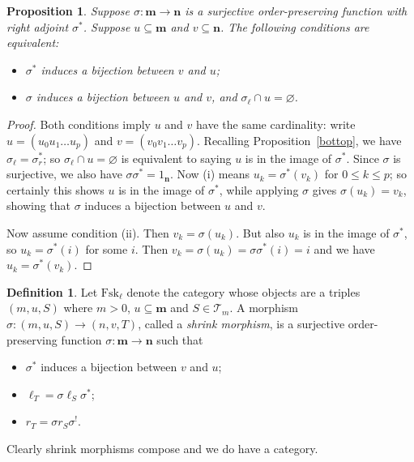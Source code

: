 \documentclass[a4paper,12pt,reqno]{amsart}
\newtheorem{proposition}[theorem]{Proposition}
\theoremstyle{definition}
\newtheorem*{Definition}{Definition}%
\theoremstyle{fact}
\theoremstyle{genquest}
\theoremstyle{step}
\newcommand{\lra}{\longrightarrow}
\def\CT{{\mathscr T}}
\def\ordm{{\mathbf{m}}}
\def\ordn{{\mathbf{n}}}
\begin{document}
\begin{proposition}\label{surju}
Suppose $\sigma :\ordm \lra \ordn$ is a surjective order-preserving function
with right adjoint $\sigma^*$. 
Suppose $u\subseteq \ordm$ and $v\subseteq \ordn$. 
The following conditions are equivalent:
\begin{itemize}
\item[(i)] $\sigma^*$ induces a bijection between $v$ and $u$;
\item[(ii)] $\sigma$ induces a bijection between $u$ and $v$, and 
$\sigma_{\ell}\cap u = \varnothing$.
\end{itemize}
\end{proposition}
\begin{proof}
Both conditions imply $u$ and $v$ have the same cardinality: write
$u=(u_0u_1\dots u_{p})$ and $v=(v_0v_1\dots v_{p})$.
Recalling Proposition~\ref{bottop}, we have
$\sigma_{\ell}=\sigma^*_{r}$; so
$\sigma_{\ell}\cap u = \varnothing$ is equivalent to saying 
$u$ is in the image of $\sigma^*$. 
Since $\sigma$ is surjective, we also have $\sigma \sigma^*=1_{\ordn}$.
Now (i) means $u_k=\sigma^*(v_k)$ for $0\le k\le p$; so certainly this shows
$u$ is in the image of $\sigma^*$, while applying $\sigma$ gives
$\sigma(u_k) = v_k$, showing that $\sigma$ induces a bijection 
between $u$ and $v$. 

Now assume condition (ii). Then $v_k=\sigma(u_k)$. But also $u_k$
is in the image of $\sigma^*$, so $u_k=\sigma^*(i)$ for some $i$.
Then $v_k=\sigma(u_k)=\sigma \sigma^*(i) = i$ and we have
$u_k=\sigma^*(v_k)$.  
\end{proof}

\begin{Definition}
Let $\mathrm{Fsk}_{\ell}$ denote the category whose objects are a triples 
$(m,u,S)$ where $m>0$, $u\subseteq \ordm$ and $S\in \CT_m$.
A morphism $\sigma : (m,u,S) \lra (n,v,T)$,
called a {\em shrink morphism}, is a surjective
order-preserving function $\sigma : \ordm \lra \ordn$ such that
\begin{itemize}
\item[(a)] $\sigma^*$ induces a bijection between $v$ and $u$; 
\item[(b)] $\ell_T = \sigma \ell_S \sigma^*$;
\item[(c)] $r_T = \sigma r_S \sigma^!$.
\end{itemize}   
Clearly shrink morphisms compose and we do have a category.
\end{Definition}
\end{document}
